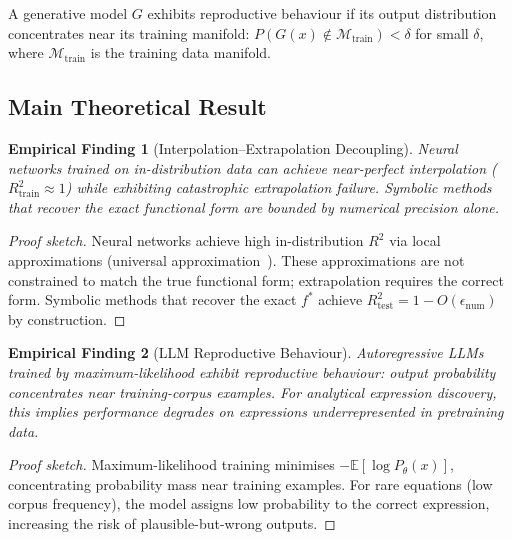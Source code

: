 \documentclass[twoside,11pt]{article}
\newcommand{\Rsq}{R^{2}}
\newcommand{\Rtrain}{R^{2}_{\mathrm{train}}}
\newcommand{\Rtest}{R^{2}_{\mathrm{test}}}
\newtheorem{finding}{Empirical Finding}
\begin{document}
\begin{definition}
\label{def:reproductive}
A generative model $G$ exhibits reproductive behaviour if its output distribution concentrates near its training manifold: $P(G(x) \notin \mathcal{M}_{\text{train}}) < \delta$ for small $\delta$, where $\mathcal{M}_{\text{train}}$ is the training data manifold.
\end{definition}

\subsection{Main Theoretical Result}\label{subsec:main-theoretical-result}
\label{sec:theory_main}

\begin{finding}[Interpolation--Extrapolation Decoupling]
\label{prop:interp_extrap_decoupling}
Neural networks trained on in-distribution data can achieve near-perfect interpolation ($\Rtrain \approx 1$) while exhibiting catastrophic extrapolation failure. Symbolic methods that recover the exact functional form are bounded by numerical precision alone.
\end{finding}

\begin{proof}[Proof sketch]
Neural networks achieve high in-distribution $\Rsq$ via local approximations (universal approximation~\citep{hornik1989multilayer}). These approximations are not constrained to match the true functional form; extrapolation requires the correct form. Symbolic methods that recover the exact $f^*$ achieve $\Rtest = 1 - O(\epsilon_{\text{num}})$ by construction.
\end{proof}

\begin{finding}[LLM Reproductive Behaviour]
\label{thm:llm_reproductive}
Autoregressive LLMs trained by maximum-likelihood exhibit reproductive behaviour: output probability concentrates near training-corpus examples. For analytical expression discovery, this implies performance degrades on expressions underrepresented in pretraining data.
\end{finding}

\begin{proof}[Proof sketch]
Maximum-likelihood training minimises $-\mathbb{E}[\log P_\theta(x)]$, concentrating probability mass near training examples. For rare equations (low corpus frequency), the model assigns low probability to the correct expression, increasing the risk of plausible-but-wrong outputs.
\end{proof}
\end{document}
